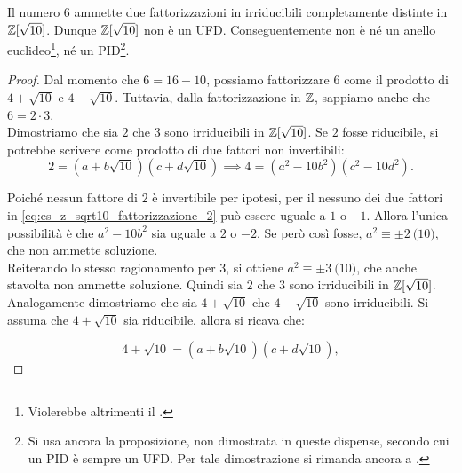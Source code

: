 \documentclass[11pt]{scrbook}
\begin{document}
\begin{example}
    Il numero $6$ ammette due fattorizzazioni in irriducibili
    completamente distinte in $\mathbb{Z}[\sqrt{10}]$. Dunque
    $\mathbb{Z}[\sqrt{10}]$ non è un UFD. Conseguentemente non è né un anello
    euclideo\footnote{Violerebbe altrimenti il .}, né un
    PID\footnote{Si usa ancora la proposizione, non dimostrata
    in queste dispense, secondo cui un PID è sempre un UFD. Per
    tale dimostrazione si rimanda ancora a \cite[pp.~124-126]{di2013algebra}.}.
\end{example}    

\begin{proof}
    Dal momento che $6=16-10$,
    possiamo fattorizzare $6$ come il prodotto
    di $4+\sqrt{10}$ e $4-\sqrt{10}$. Tuttavia, dalla
    fattorizzazione in $\mathbb Z$, sappiamo anche
    che $6=2 \cdot 3$. \\
    
    Dimostriamo che sia $2$ che $3$ sono irriducibili
    in $\mathbb Z[\sqrt{10}]$. Se $2$ fosse riducibile,
    si potrebbe scrivere come prodotto
    di due fattori non invertibili: \\
    
    \begin{equation}
        \label{eq:es_z_sqrt10_fattorizzazione_2}
        2 = (a + b\sqrt{10})(c + d\sqrt{10}) \implies 4 = (a^2 - 10b^2)(c^2 - 10d^2).
    \end{equation}
    
    \vskip 0.1in
    
    Poiché nessun fattore di $2$ è invertibile per ipotesi, per il
     nessuno dei due
    fattori in \eqref{eq:es_z_sqrt10_fattorizzazione_2} può essere uguale a $1$ o $-1$.
    Allora l'unica possibilità è che $a^2 - 10b^2$ sia uguale a $2$ o
    $-2$. Se però così fosse, $a^2 \equiv \pm 2 \pod{10}$, che
    non ammette soluzione. \\
    
    Reiterando lo stesso ragionamento per $3$,
    si ottiene $a^2 \equiv \pm 3 \pod{10}$, che anche
    stavolta non ammette soluzione. Quindi sia $2$ che
    $3$ sono irriducibili in $\mathbb Z[\sqrt{10}]$. \\
    
    Analogamente dimostriamo che sia $4+\sqrt{10}$ che
    $4-\sqrt{10}$ sono irriducibili. Si assuma che
    $4+\sqrt{10}$ sia riducibile, allora si ricava che:
    
    \[ 4+\sqrt{10} = (a + b\sqrt{10})(c + d\sqrt{10}), \]
    

\end{proof}
\end{document}

